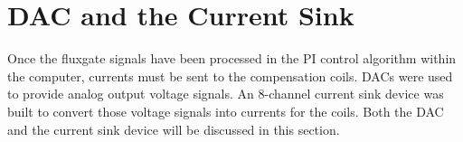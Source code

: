 





\section{DAC and the Current Sink}\label{sec:sink}

Once the fluxgate signals have been processed in the PI control algorithm within the computer, currents must be sent to the compensation coils. DACs were used to provide analog output voltage signals. An 8-channel current sink device was built to convert those voltage signals into currents for the coils. Both the DAC and the current sink device will be discussed in this section. 


